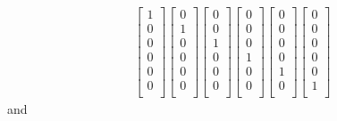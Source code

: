 \documentclass[a4paper,10pt]{article}
\begin{document}
\begin{equation*}
\begin{aligned}
{\begin{bmatrix}
1 \\
0 \\
0 \\
0 \\
0 \\
0 \\
\end{bmatrix}}
{\begin{bmatrix}
0 \\
1 \\
0 \\
0 \\
0 \\
0 \\
\end{bmatrix}}
{\begin{bmatrix}
0 \\
0 \\
1 \\
0 \\
0 \\
0 \\
\end{bmatrix}}
{\begin{bmatrix}
0 \\
0 \\
0 \\
1 \\
0 \\
0 \\
\end{bmatrix}}
{\begin{bmatrix}
0 \\
0 \\
0 \\
0 \\
1 \\
0 \\
\end{bmatrix}}
{\begin{bmatrix}
0 \\
0 \\
0 \\
0 \\
0 \\
1 \\
\end{bmatrix}}
\end{aligned}
\end{equation*}
and
\end{document}
